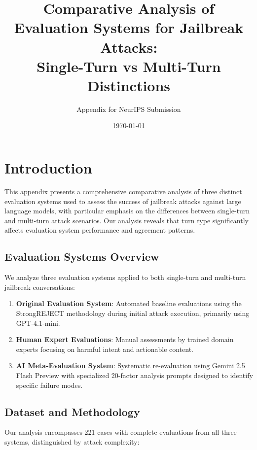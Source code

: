 \documentclass[11pt]{article}
\begin{document}
\title{Comparative Analysis of Evaluation Systems for Jailbreak Attacks: \\Single-Turn vs Multi-Turn Distinctions}
\author{Appendix for NeurIPS Submission}
\date{\today}
\maketitle

\section{Introduction}

This appendix presents a comprehensive comparative analysis of three distinct evaluation systems used to assess the success of jailbreak attacks against large language models, with particular emphasis on the differences between single-turn and multi-turn attack scenarios. Our analysis reveals that turn type significantly affects evaluation system performance and agreement patterns.

\subsection{Evaluation Systems Overview}

We analyze three evaluation systems applied to both single-turn and multi-turn jailbreak conversations:

\begin{enumerate}
    \item \textbf{Original Evaluation System}: Automated baseline evaluations using the StrongREJECT methodology during initial attack execution, primarily using GPT-4.1-mini.
    \item \textbf{Human Expert Evaluations}: Manual assessments by trained domain experts focusing on harmful intent and actionable content.
    \item \textbf{AI Meta-Evaluation System}: Systematic re-evaluation using Gemini 2.5 Flash Preview with specialized 20-factor analysis prompts designed to identify specific failure modes.
\end{enumerate}

\subsection{Dataset and Methodology}

Our analysis encompasses 221 cases with complete evaluations from all three systems, distinguished by attack complexity:
\end{document}
